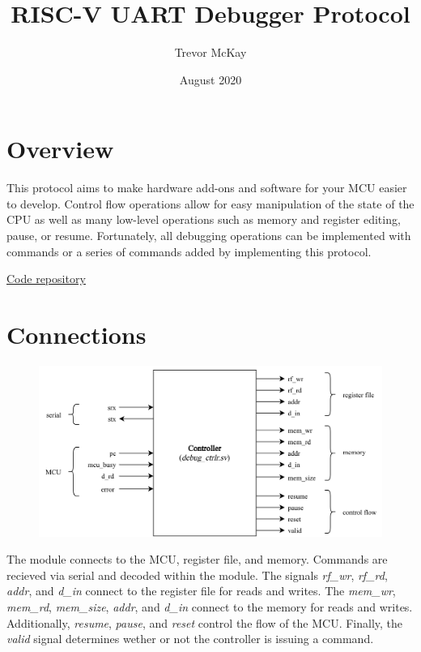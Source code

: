 \documentclass[10pt,a4paper]{article}
\title{RISC-V UART Debugger Protocol}
\author{Trevor McKay}
\date{August 2020}
\begin{document}
\maketitle
\tableofcontents

\newpage

\section{Overview}

This protocol aims to make hardware add-ons and software for your MCU easier to develop. Control flow operations
allow for easy manipulation of the state of the CPU as well as many low-level operations such
as memory and register editing, pause, or resume. Fortunately, all debugging operations can be
implemented with commands or a series of commands added by implementing this
protocol.

\medskip
\noindent\underline{\href{https://github.com/trmckay/riscv-uart-debugger}{Code repository}}

\section{Connections}

\begin{figure}[H]
    \includegraphics[width=\textwidth]{blackbox}
\end{figure}
\medskip

The module connects to the MCU, register file, and memory. Commands are recieved via serial
and decoded within the module. The signals \emph{rf\_wr}, \emph{rf\_rd}, \emph{addr}, and
\emph{d\_in} connect to the register file for reads and writes. The \emph{mem\_wr},
\emph{mem\_rd}, \emph{mem\_size}, \emph{addr}, and \emph{d\_in} connect to the memory
for reads and writes. Additionally, \emph{resume}, \emph{pause}, and \emph{reset} control
the flow of the MCU\@. Finally, the \emph{valid} signal determines wether or not the controller
is issuing a command.
\end{document}
